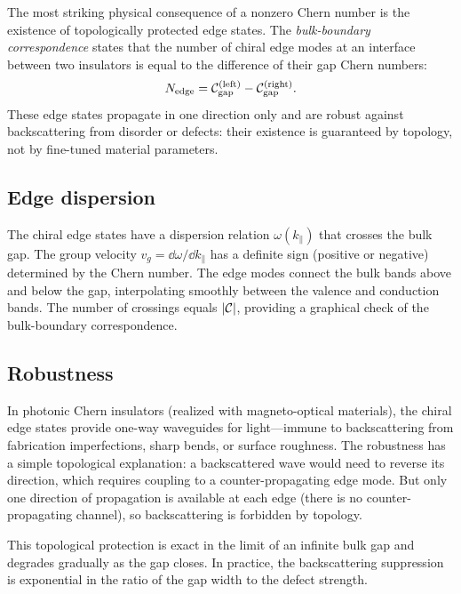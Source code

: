 The most striking physical consequence of a nonzero Chern number is the
existence of topologically protected edge states. The
\emph{bulk-boundary correspondence} states that the number of chiral edge
modes at an interface between two insulators is equal to the difference of
their gap Chern numbers:
\begin{equation}
 N_{\mathrm{edge}} = \mathcal{C}_{\mathrm{gap}}^{(\mathrm{left})}
 - \mathcal{C}_{\mathrm{gap}}^{(\mathrm{right})}.
 \label{eq:bbc}
\end{equation}
These edge states propagate in one direction only and are robust against
backscattering from disorder or defects: their existence is guaranteed by
topology, not by fine-tuned material parameters.

\subsection{Edge dispersion}
\label{ssec:edge-dispersion}

The chiral edge states have a dispersion relation $\omega(k_\parallel)$
that crosses the bulk gap. The group velocity $v_g = \dd\omega/\dd
k_\parallel$ has a definite sign (positive or negative) determined by the
Chern number. The edge modes connect the bulk bands above and below the
gap, interpolating smoothly between the valence and conduction bands.
The number of crossings equals $|\mathcal{C}|$, providing a graphical check
of the bulk-boundary correspondence.

\subsection{Robustness}
\label{ssec:edge-robustness}

In photonic Chern insulators (realized with magneto-optical materials),
the chiral edge states provide one-way waveguides for light---immune to
backscattering from fabrication imperfections, sharp bends, or surface
roughness. The robustness has a simple topological explanation: a
backscattered wave would need to reverse its direction, which requires
coupling to a counter-propagating edge mode. But only one direction of
propagation is available at each edge (there is no counter-propagating
channel), so backscattering is forbidden by topology.

This topological protection is exact in the limit of an infinite bulk
gap and degrades gradually as the gap closes. In practice, the
backscattering suppression is exponential in the ratio of the gap width
to the defect strength.


